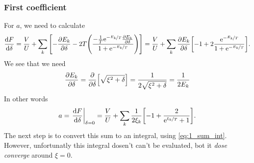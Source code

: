 \documentclass[11pt,letter, swedish, english
]{article}
\newcommand{\Tc}{\ensuremath{T_{\text{c}}}}
\begin{document}
\subsubsection{First coefficient}
For $a$, we need to calculate
\begin{equation}\label{eq:2a_dF/ddelta}
\dv{F}{\delta}=\frac{V}{U}
+\sum_k\qty[-\pdv{E_k}{\delta}
-2T\qty(\frac{-\frac{1}{T}\mathrm{e}^{-\nicefrac{E_k}{T}}\pdv{E_k}{\delta}}
{1+\mathrm{e}^{-\nicefrac{E_k}{T}}})]
=\frac{V}{U}
+\sum_k\pdv{E_k}{\delta}\qty[-1
+2\frac{\mathrm{e}^{-\nicefrac{E_k}{T}}}{1+\mathrm{e}^{-\nicefrac{E_k}{T}}}].
\end{equation}
We see that we need
\begin{equation}\label{eq:2a_dEk/ddelta}
\pdv{E_k}{\delta}=\pdv{\delta}\qty[\sqrt{\xi^2+\delta}]
=\frac{1}{2\sqrt{\xi^2+\delta}}=\frac{1}{2E_k}
\end{equation}
In other words
\begin{equation}\label{eq:2a_a1}
a=\eval{\dv{F}{\delta}}_{\delta=0}
=\frac{V}{U}
+\sum_k\frac{1}{2\xi_k}\qty[-1
+\frac{2}{\ee^{\nicefrac{\xi_k}{T}}+1}].
\end{equation}
The next step is to convert this sum to an integral, using
\eqref{eq:1_sum_int}. However, unfortunatly this integral dosen't can't be
evaluated, bot it \emph{dose converge} around $\xi=0$.

\end{document}
